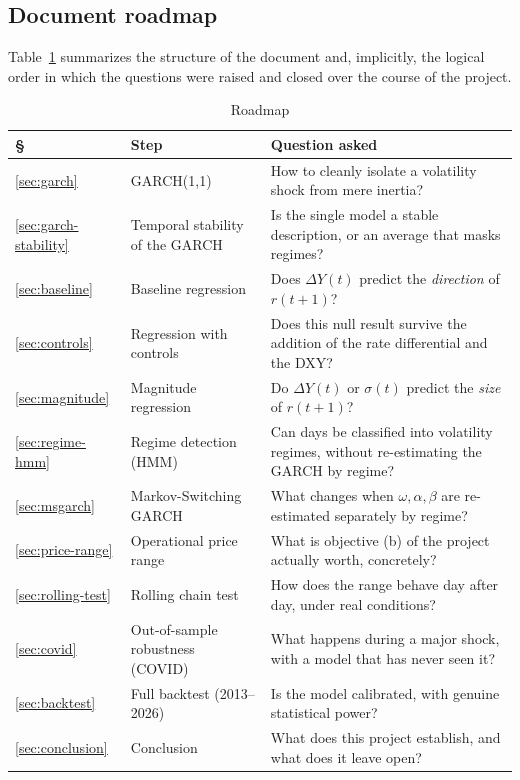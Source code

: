 \documentclass[12pt,a4paper]{article}
\begin{document}
\subsection{Document roadmap}

Table~\ref{tab:roadmap} summarizes the structure of the document and,
implicitly, the logical order in which the questions were
raised and closed over the course of the project.

\begin{table}[H]
	\centering
	\small
	\caption{Roadmap}
	\label{tab:roadmap}
	\begin{tabular}{@{}p{0.9cm}p{6.3cm}p{7.2cm}@{}}
		\toprule
		\S{} & Step & Question asked \\
		\midrule
		\ref{sec:garch} & GARCH(1,1) & How to cleanly isolate a volatility shock
		from mere inertia? \\
		\ref{sec:garch-stability} & Temporal stability of the GARCH & Is the
		single model a stable description, or an average that
		masks regimes? \\
		\ref{sec:baseline} & Baseline regression & Does $\Delta Y(t)$
		predict the \emph{direction} of $r(t+1)$? \\
		\ref{sec:controls} & Regression with controls & Does this null result
		survive the addition of the rate differential and the DXY? \\
		\ref{sec:magnitude} & Magnitude regression & Do $\Delta Y(t)$ or
		$\sigma(t)$ predict the \emph{size} of $r(t+1)$? \\
		\ref{sec:regime-hmm} & Regime detection (HMM) & Can days be
		classified into volatility regimes, without re-estimating the
		GARCH by regime? \\
		\ref{sec:msgarch} & Markov-Switching GARCH & What changes when
		$\omega,\alpha,\beta$ are re-estimated separately by regime? \\
		\ref{sec:price-range} & Operational price range & What is
		objective (b) of the project actually worth, concretely? \\
		\ref{sec:rolling-test} & Rolling chain test & How does the
		range behave day after day, under real
		conditions? \\
		\ref{sec:covid} & Out-of-sample robustness (COVID) & What
		happens during a major shock, with a model that has
		never seen it? \\
		\ref{sec:backtest} & Full backtest (2013--2026) & Is the model
		calibrated, with genuine statistical power? \\
		\ref{sec:conclusion} & Conclusion & What does this project establish,
		and what does it leave open? \\
		\bottomrule
	\end{tabular}
\end{table}
\end{document}
